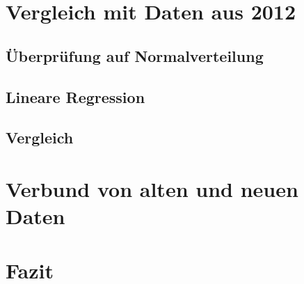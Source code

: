 \section{Vergleich mit Daten aus 2012}
\subsection{Überprüfung auf Normalverteilung}
\subsection{Lineare Regression}
\subsection{Vergleich}

\section{Verbund von alten und neuen Daten}

\section{Fazit}


